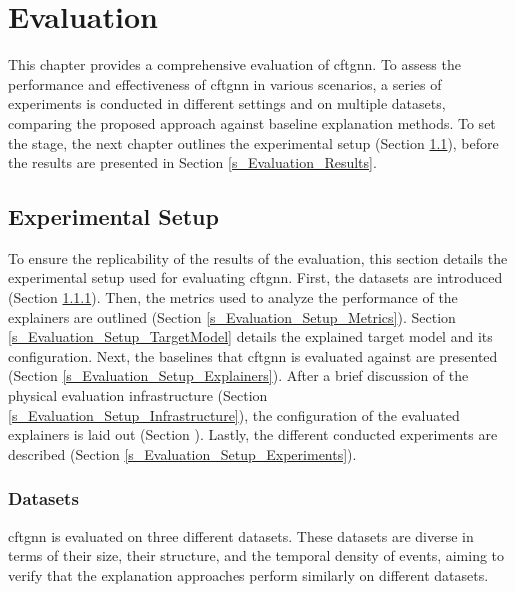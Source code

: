 \section{Evaluation}
\label{s_Evaluation}

This chapter provides a comprehensive evaluation of \gls{cftgnn}. To assess the performance and effectiveness of \gls{cftgnn} in various scenarios, a series of experiments is conducted in different settings and on multiple datasets, comparing the proposed approach against baseline explanation methods. To set the stage, the next chapter outlines the experimental setup (Section \ref{s_Evaluation_Setup}), before the results are presented in Section \ref{s_Evaluation_Results}.

\subsection{Experimental Setup}
\label{s_Evaluation_Setup}

To ensure the replicability of the results of the evaluation, this section details the experimental setup used for evaluating \gls{cftgnn}. First, the datasets are introduced (Section \ref{s_Evaluation_Setup_Datasets}). Then, the metrics used to analyze the performance of the explainers are outlined (Section \ref{s_Evaluation_Setup_Metrics}). Section \ref{s_Evaluation_Setup_TargetModel} details the explained target model and its configuration. Next, the baselines that \gls{cftgnn} is evaluated against are presented (Section \ref{s_Evaluation_Setup_Explainers}). After a brief discussion of the physical evaluation infrastructure (Section \ref{s_Evaluation_Setup_Infrastructure}), the configuration of the evaluated explainers is laid out (Section ). Lastly, the different conducted experiments are described (Section \ref{s_Evaluation_Setup_Experiments}).

\subsubsection{Datasets}
\label{s_Evaluation_Setup_Datasets}

\gls{cftgnn} is evaluated on three different datasets. These datasets are diverse in terms of their size, their structure, and the temporal density of events, aiming to verify that the explanation approaches perform similarly on different datasets.

